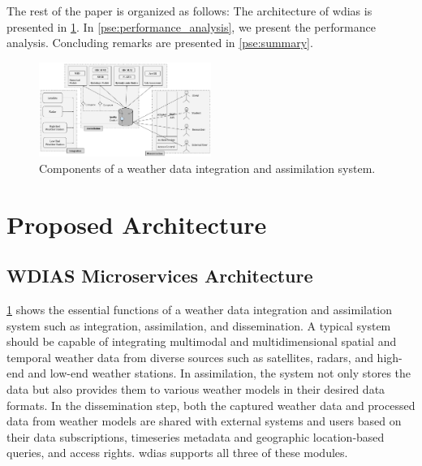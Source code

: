 \documentclass[conference]{IEEEtran}
\begin{document}
The rest of the paper is organized as follows: The architecture of \acrshort{wdias} is presented in \cref{pse:wdias_architecture}. In \cref{pse:performance_analysis}, we present the performance analysis. Concluding remarks are presented in \cref{pse:summary}.


\begin{figure}[!tb]
\centerline{\includegraphics[width=0.5\textwidth]{images/weather_data_system_components_p1.pdf}}
\caption{Components of a weather data integration and assimilation system.}
\label{pfi:wdia_components}
\end{figure}

\section{Proposed Architecture}
\label{pse:wdias_architecture}

\subsection{WDIAS Microservices Architecture}
\label{psubse:wdias_microservices}

\cref{pfi:wdia_components} shows the essential functions of a weather data integration and assimilation system such as integration, assimilation, and dissemination. A typical system should be capable of integrating multimodal and multidimensional spatial and temporal weather data from diverse sources such as satellites, radars, and high-end and low-end weather stations. In assimilation, the system not only stores the data but also provides them to various weather models in their desired data formats. In the dissemination step, both the captured weather data and processed data from weather models are shared with external systems and users based on their data subscriptions, timeseries metadata and geographic location-based queries, and access rights. \acrshort{wdias} supports all three of these modules.
\end{document}
